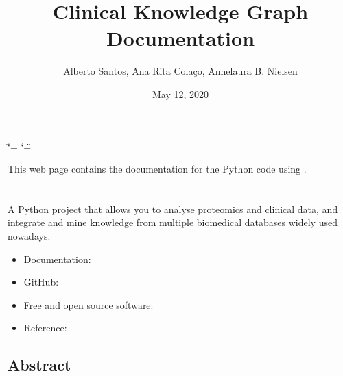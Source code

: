 \documentclass[letterpaper,10pt,english]{sphinxmanual}
\title{Clinical Knowledge Graph Documentation}
\date{May 12, 2020}
\author{Alberto Santos, Ana Rita Colaço, Annelaura B. Nielsen}
\begin{document}
\ifdefined\shorthandoff
  \ifnum\catcode`\=\string=\active\shorthandoff{=}\fi
  \ifnum\catcode`\"=\active{}\fi
\fi

\pagestyle{empty}
\sphinxmaketitle
\pagestyle{plain}
\sphinxtableofcontents
\pagestyle{normal}
\label{\detokenize{index::doc}}


This web page contains the documentation for the Python code using .




\chapter{}
\label{\detokenize{INTRO:clinical-knowledge-graph}}\label{\detokenize{INTRO::doc}}
 

A Python project that allows you to analyse proteomics and clinical data, and integrate and mine knowledge from multiple biomedical databases widely used nowadays.
\begin{itemize}
\item {} 
Documentation: 

\item {} 
GitHub: 

\item {} 
Free and open source software: 

\item {} 
Reference: 

\end{itemize}


\section{Abstract}
\label{\detokenize{INTRO:abstract}}
\end{document}

